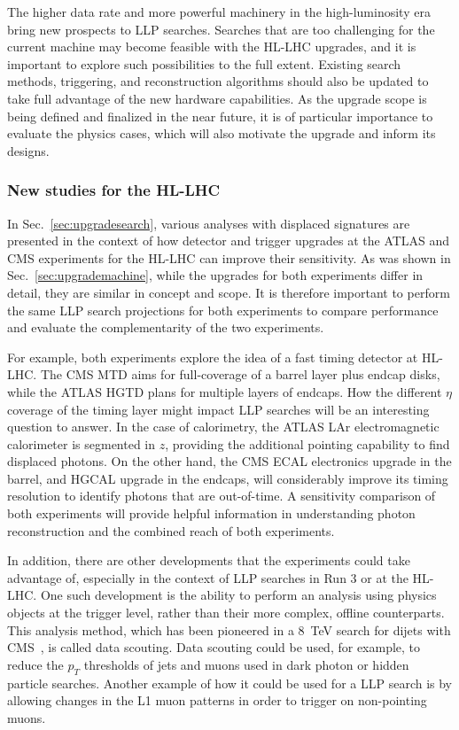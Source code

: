 
The higher data rate and more powerful machinery in the high-luminosity era bring new prospects to LLP searches. Searches that are too challenging for the current machine may become feasible with the HL-LHC upgrades, and it is important to explore such possibilities to the full extent. Existing search methods, triggering, and reconstruction algorithms should also be updated to take full advantage of the new hardware capabilities. As the upgrade scope is being defined and finalized in the near future, it is of particular importance to evaluate the physics cases, which will also motivate the upgrade and inform its designs.

\subsubsection{New studies for the HL-LHC}

In Sec.~\ref{sec:upgradesearch}, various analyses with displaced signatures are presented in the context of how detector and trigger upgrades at the ATLAS and CMS experiments for the HL-LHC can improve their sensitivity. As was shown in Sec.~\ref{sec:upgrademachine}, while the upgrades for both experiments differ in detail, they are similar in concept and scope. It is therefore important to perform the same LLP search projections for both experiments to compare performance and evaluate the complementarity of the two experiments.

For example, both experiments explore the idea of a fast timing detector at HL-LHC. The CMS MTD aims for full-coverage of a barrel layer plus endcap disks, while the ATLAS HGTD plans for multiple layers of endcaps. How the different $\eta$ coverage of the timing layer might impact LLP searches will be an interesting question to answer. In the case of calorimetry, the ATLAS LAr electromagnetic calorimeter is segmented in $z$, providing the additional pointing capability to find displaced photons. On the other hand, the CMS ECAL electronics upgrade in the barrel, and HGCAL upgrade in the endcaps, will considerably improve its timing resolution to identify photons that are out-of-time. A sensitivity comparison of both experiments will provide helpful information in understanding photon reconstruction and the combined reach of both experiments.

In addition, there are other developments that the experiments could take advantage of, especially in the context of LLP searches in Run 3 or at the HL-LHC. One such development is the ability to perform an analysis using physics objects at the trigger level, rather than their more complex, offline counterparts. This analysis method, which has been pioneered in a 8~TeV search for dijets with CMS~\cite{Khachatryan:2016ecr}, is called data scouting. Data scouting could be used, for example, to reduce the $p_{T}$ thresholds of jets and muons used in dark photon or hidden particle searches. Another example of how it could be used for a LLP search is by allowing changes in the L1 muon patterns in order to trigger on non-pointing muons.

